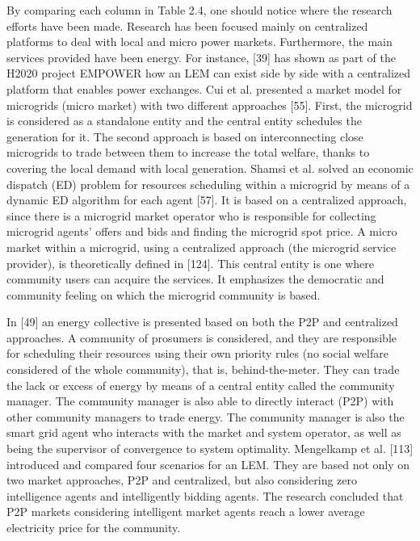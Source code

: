 By comparing each column in Table 2.4, one should notice where the research efforts have been made. Research has been focused mainly on centralized platforms to deal with local and micro power markets. Furthermore, the main services provided have been energy. For instance, [39] has shown as part of the H2020 project EMPOWER how an LEM can exist side by side with a centralized platform that enables power exchanges. Cui et al. presented a market model for microgrids (micro market) with two different approaches [55]. First, the microgrid is considered as a standalone entity and the central entity schedules the generation for it. The second approach is based on interconnecting close microgrids to trade between them to increase the total welfare, thanks to covering the local demand with local generation. Shamsi et al. solved an economic dispatch (ED) problem for resources scheduling within a microgrid by means of a dynamic ED algorithm for each agent [57]. It is based on a centralized approach, since there is a microgrid market operator who
is responsible for collecting microgrid agents' offers and bids and finding the microgrid spot price. A micro market within a microgrid, using a centralized approach (the microgrid service provider), is theoretically defined in [124]. This central entity is one where community users can acquire the services. It emphasizes the democratic and community feeling on which the microgrid community is based.

In [49] an energy collective is presented based on both the P2P and centralized approaches. A community of prosumers is considered, and they are responsible for scheduling their resources using their own priority rules (no social welfare considered of the whole community), that is, behind-the-meter. They can trade the lack or excess of energy by means of a central entity called the community manager. The community manager is also able to directly interact (P2P) with other community managers to trade energy. The community manager is also the smart grid agent who interacts with the market and system operator, as well as being the supervisor of convergence to system optimality. Mengelkamp et al. [113] introduced and compared four scenarios for an LEM. They are based not only on two market approaches, P2P and centralized, but also considering zero intelligence agents and intelligently bidding agents. The research concluded that P2P markets considering intelligent market agents reach a lower average electricity price for the community.

